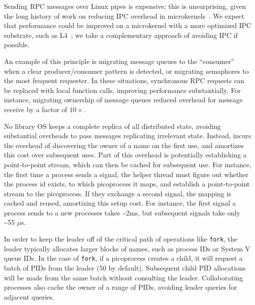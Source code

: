 \vspace{5pt}
Sending RPC messages over Linux pipes is expensive;
this is unsurprising, given the long history of 
work on reducing IPC overhead in microkernels~\citep{liedtke93sosp,chen93memory}.  
We expect that \sysname{} performance could be improved on a 
microkernel with
a more optimized IPC substrate, such as L4~\citep{liedtke95sosp,klein09sel4,elphinstone13microkernels};
we take a complementary approach of avoiding IPC if possible.

An example of this principle is migrating message queues to the ``consumer'' when a 
clear producer/consumer pattern is detected, or migrating semaphores to the most frequent requester.
In these situations, synchronous RPC requests can be replaced with local function calls, improving
performance substantially.  For instance, migrating ownership of message queues 
reduced overhead for message receive by a factor of $10\times$.

\vspace{5pt}
No library OS keeps a complete replica of all distributed state,
avoiding substantial overheads to pass messages replicating irrelevant state.
Instead, \sysname{} incurs the overhead of discovering the owner of a name
on the first use, and amortizes this cost over subsequent uses.
Part of this overhead is potentially establishing a point-to-point stream,
which can then be cached for subsequent use.
For instance, the first time a process sends a signal, the helper thread 
must figure out whether the process id exists, to which picoprocess it maps,
and establish a point-to-point stream to the picoprocess.
If they exchange a second signal, the mapping is cached and reused, amortizing this 
setup cost.  For instance, the first signal a process sends to a new processes
takes \~{}2ms, but subsequent signals take only \~{}55 $\mu$s.

\vspace{5pt}
In order to keep the leader off of the critical path of operations like {\tt fork}, 
the leader typically allocates larger blocks of names, such as process IDs or System V queue IDs.
In the case of {\tt fork}, if a picoprocess creates a child, it will request a batch of 
PIDs from the leader (50 by default).  Subsequent child PID allocations will be made from the same 
batch without consulting the leader.
Collaborating processes also cache the owner of a range of PIDs, avoiding 
leader queries for adjacent queries.

